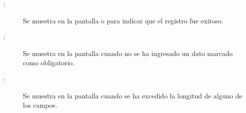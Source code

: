 	
\begin{description}

	\item[ :] Se muestra en la pantalla  o  para indicar que el registro fue exitoso.
	\item[ :] Se muestra en la pantalla  cuando no se ha ingresado un dato marcado como obligatorio.
	\item[ :] Se muestra en la pantalla  cuando se ha excedido la longitud de alguno de los campos.
\end{description}
